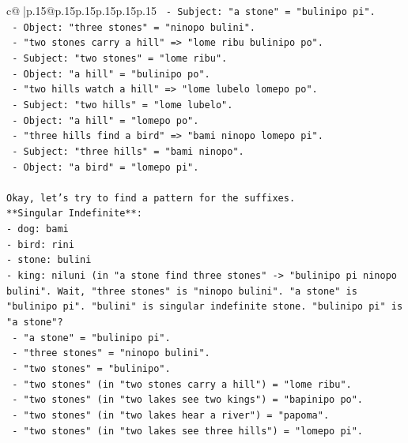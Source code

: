 \documentclass{article}
\begin{document}
{\begin{supertabular}{c@{$\;$}|p{.15\linewidth}@{}p{.15\linewidth}p{.15\linewidth}p{.15\linewidth}p{.15\linewidth}p{.15\linewidth}}
{{{\texttt{      {-} Subject: "a stone" = "bulinipo pi".} \\
\texttt{      {-} Object: "three stones" = "ninopo bulini".} \\
\texttt{    {-} "two stones carry a hill" => "lome ribu bulinipo po".} \\
\texttt{      {-} Subject: "two stones" = "lome ribu".} \\
\texttt{      {-} Object: "a hill" = "bulinipo po".} \\
\texttt{    {-} "two hills watch a hill" => "lome lubelo lomepo po".} \\
\texttt{      {-} Subject: "two hills" = "lome lubelo".} \\
\texttt{      {-} Object: "a hill" = "lomepo po".} \\
\texttt{    {-} "three hills find a bird" => "bami ninopo lomepo pi".} \\
\texttt{      {-} Subject: "three hills" = "bami ninopo".} \\
\texttt{      {-} Object: "a bird" = "lomepo pi".} \\
\\ 
\texttt{Okay, let's try to find a pattern for the suffixes.} \\
\texttt{**Singular Indefinite**:} \\
\texttt{{-} dog: bami} \\
\texttt{{-} bird: rini} \\
\texttt{{-} stone: bulini} \\
\texttt{{-} king: niluni (in "a stone find three stones" {-}> "bulinipo pi ninopo bulini". Wait, "three stones" is "ninopo bulini". "a stone" is "bulinipo pi". "bulini" is singular indefinite stone. "bulinipo pi" is "a stone"?} \\
\texttt{  {-} "a stone" = "bulinipo pi".} \\
\texttt{  {-} "three stones" = "ninopo bulini".} \\
\texttt{  {-} "two stones" = "bulinipo".} \\
\texttt{  {-} "two stones" (in "two stones carry a hill") = "lome ribu".} \\
\texttt{  {-} "two stones" (in "two lakes see two kings") = "bapinipo po".} \\
\texttt{  {-} "two stones" (in "two lakes hear a river") = "papoma".} \\
\texttt{  {-} "two stones" (in "two lakes see three hills") = "lomepo pi".} \\
\\ 
}}}
\end{supertabular}}
\end{document}
